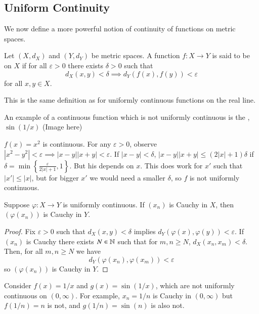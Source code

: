 \subsection{Uniform Continuity}


We now define a more powerful notion of continuity of functions on metric spaces.

\begin{definition}
    Let $(X,d_X)$ and $(Y,d_Y)$ be metric spaces. A function $f:X\rightarrow Y$ is said to be  on $X$ if for all $\varepsilon > 0$ there exists $\delta > 0$ such that $$d_X(x,y) < \delta \implies d_Y(f(x),f(y)) < \varepsilon$$ for all $x,y \in X$.
\end{definition}

This is the same definition as for uniformly continuous functions on the real line.

\begin{example}
    An example of a continuous function which is not uniformly continuous is the , $\sin(1/x)$ (Image here)
\end{example}

\begin{example}
    $f(x) = x^2$ is continuous. For any $\varepsilon > 0$, observe $|x^2 - y^2| < \varepsilon \implies |x-y||x+y| < \varepsilon$. If $|x-y| < \delta$, $|x-y||x+y| \leq (2|x|+1)\delta$ if $\delta = \min\left\{\frac{\varepsilon}{2|x|+1},1\right\}$. But his depends on $x$. This does work for $x'$ such that $|x'| \leq |x|$, but for bigger $x'$ we would need a smaller $\delta$, so $f$ is not uniformly continuous.
\end{example}

\begin{proposition}
    Suppose $\varphi:X\rightarrow Y$ is uniformly continuous. If $(x_n)$ is Cauchy in $X$, then $(\varphi(x_n))$ is Cauchy in $Y$.
\end{proposition}
\begin{proof}
    Fix $\varepsilon > 0$ such that $d_X(x,y) < \delta$ implies $d_Y(\varphi(x),\varphi(y)) < \varepsilon$. If $(x_n)$ is Cauchy there exists $N \in \mathbb N$ such that for $m,n \geq N$, $d_X(x_n,x_m) < \delta$. Then, for all $m,n \geq N$ we have $$d_Y(\varphi(x_n),\varphi(x_m)) < \varepsilon$$ so $(\varphi(x_n))$ is Cauchy in $Y$.
\end{proof}

\begin{example}
    Consider $f(x) = 1/x$ and $g(x) = \sin(1/x)$, which are not uniformly continuous on $(0,\infty)$. For example, $x_n = 1/n$ is Cauchy in $(0,\infty)$ but $f(1/n) = n$ is not, and $g(1/n) = \sin(n)$ is also not.
\end{example}


